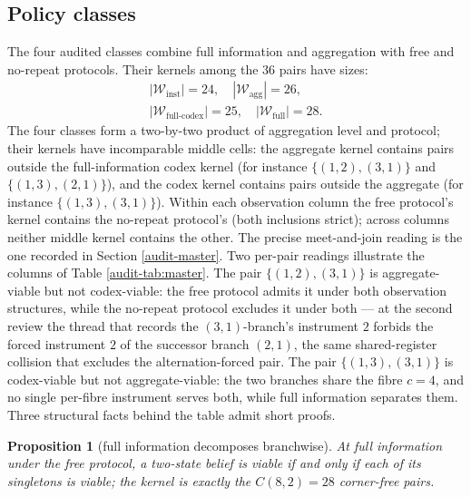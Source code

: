 \documentclass[10pt,twocolumn]{article}
\theoremstyle{plain}
\newtheorem{proposition}[theorem]{Proposition}
\theoremstyle{definition}
\theoremstyle{remark}
\begin{document}
\subsection{Policy classes}\label{audit-classes}

The four audited classes combine full information and aggregation with
free and no-repeat protocols. Their kernels among the 36 pairs have
sizes:
\begin{gather*}
|\mathcal{W}_{\mathrm{inst}}| = 24,\quad
|\mathcal{W}_{\mathrm{agg}}| = 26,\\
|\mathcal{W}_{\mathrm{full\text{-}codex}}| = 25,\quad
|\mathcal{W}_{\mathrm{full}}| = 28 .
\end{gather*}
The four classes form a two-by-two product of aggregation level and
protocol; their kernels have incomparable middle cells:
the aggregate kernel contains pairs outside the full-information codex
kernel (for instance \(\{(1,2),(3,1)\}\) and \(\{(1,3),(2,1)\}\)), and
the codex kernel contains pairs outside the aggregate (for instance
\(\{(1,3),(3,1)\}\)). Within each observation column the free protocol's
kernel contains the no-repeat protocol's (both inclusions strict); across
columns neither middle kernel contains the other. The precise
meet-and-join reading is the one recorded in Section \ref{audit-master}. Two
per-pair readings illustrate the columns of Table \ref{audit-tab:master}. The
pair \(\{(1,2),(3,1)\}\) is aggregate-viable but not codex-viable: the
free protocol admits it under both observation structures, while the
no-repeat protocol excludes it under both --- at the second review the
thread that records the \((3,1)\)-branch's instrument \(2\) forbids the
forced instrument \(2\) of the successor branch \((2,1)\), the same
shared-register collision that excludes the alternation-forced pair. The pair \(\{(1,3),(3,1)\}\) is
codex-viable but not aggregate-viable: the two branches share the fibre
\(c = 4\), and no single per-fibre instrument serves both, while
full information separates them. Three structural facts behind the table
admit short proofs.

\begin{proposition}[full information decomposes branchwise]\label{audit-prop:decomp}
At full information under the free protocol, a two-state belief is
viable if and only if each of its singletons is viable; the kernel is
exactly the \(C(8,2) = 28\) corner-free pairs.
\end{proposition}
\end{document}

